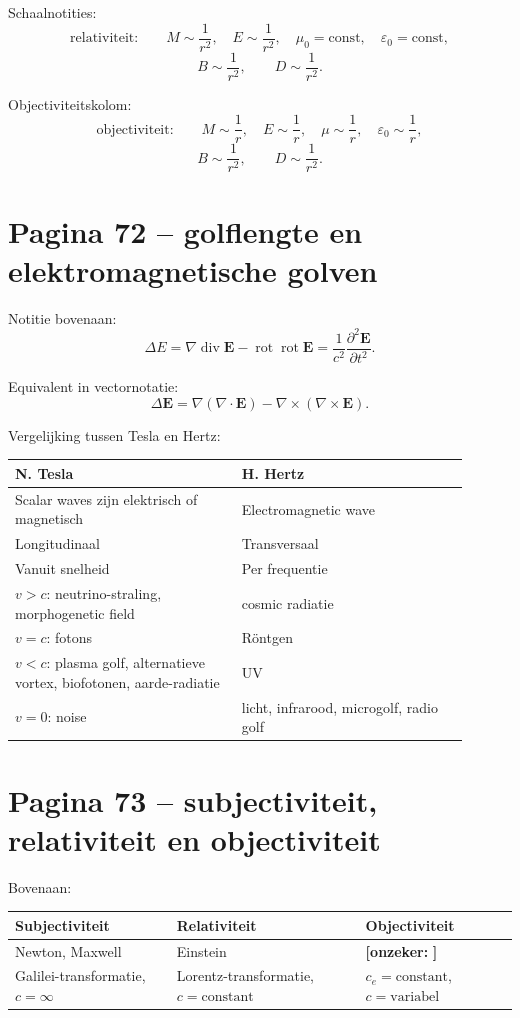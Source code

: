 \documentclass[11pt,a4paper]{article}
\newcommand{\onzeker}[1]{\ifmmode\text{\color{red!70!black}\bfseries[onzeker]}\else\textcolor{red!70!black}{\textbf{[onzeker:} #1\textbf{]}}\fi}
\newcommand{\vect}[1]{\mathbf{#1}}
\newcommand{\rot}{\operatorname{rot}}
\newcommand{\Div}{\operatorname{div}}
\newcommand{\grad}{\nabla}
\begin{document}
Schaalnotities:
$$
\text{relativiteit:}
\qquad
M\sim\frac{1}{r^2},
\quad
E\sim\frac{1}{r^2},
\quad
\mu_0=\mathrm{const},
\quad
\varepsilon_0=\mathrm{const},
$$
$$
B\sim\frac{1}{r^2},
\qquad
D\sim\frac{1}{r^2}.
$$

Objectiviteitskolom:
$$
\text{objectiviteit:}
\qquad
M\sim\frac{1}{r},
\quad
E\sim\frac{1}{r},
\quad
\mu\sim\frac{1}{r},
\quad
\varepsilon_0\sim\frac{1}{r},
$$
$$
B\sim\frac{1}{r^2},
\qquad
D\sim\frac{1}{r^2}.
$$

\section*{Pagina 72 -- golflengte en elektromagnetische golven}

Notitie bovenaan:
$$
\Delta E
=
\grad\Div\vect{E}
-
\rot\rot\vect{E}
=
\frac{1}{c^{2}}
\frac{\partial^{2}\vect{E}}{\partial t^{2}}.
$$

Equivalent in vectornotatie:
$$
\Delta \vect{E}
=
\nabla(\nabla\cdot\vect{E})
-
\nabla\times(\nabla\times\vect{E}).
$$

Vergelijking tussen Tesla en Hertz:

\begin{longtable}{p{0.45\linewidth}p{0.45\linewidth}}
\toprule
\textbf{N. Tesla} & \textbf{H. Hertz}\\
\midrule
Scalar waves zijn elektrisch of magnetisch & Electromagnetic wave\\
Longitudinaal & Transversaal\\
Vanuit snelheid & Per frequentie\\
$v>c$: neutrino-straling, morphogenetic field & cosmic radiatie\\
$v=c$: fotons & Röntgen\\
$v<c$: plasma golf, alternatieve vortex, biofotonen, aarde-radiatie & UV\\
$v=0$: noise & licht, infrarood, microgolf, radio golf\\
\bottomrule
\end{longtable}

\section*{Pagina 73 -- subjectiviteit, relativiteit en objectiviteit}

Bovenaan:
\begin{center}
\begin{tabular}{lll}
\toprule
Subjectiviteit & Relativiteit & Objectiviteit\\
\midrule
Newton, Maxwell & Einstein & \onzeker{}\\
Galilei-transformatie, $c=\infty$ &
Lorentz-transformatie, $c=\mathrm{constant}$ &
$c_e=\mathrm{constant}$, $c=\mathrm{variabel}$\\
\bottomrule
\end{tabular}
\end{center}
\end{document}
